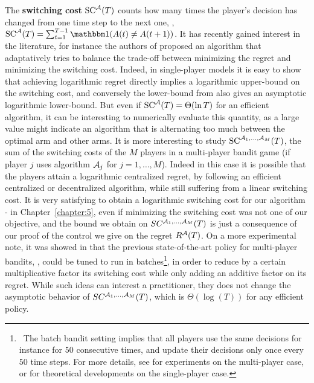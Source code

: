 The \textbf{switching cost} $\mathrm{SC}^{\mathcal{A}}(T)$ counts how many times the player's decision has changed from one time step to the next one, \ie, $\mathrm{SC}^{\cA}(T) = \sum_{t=1}^{T-1} \indic(A(t) \neq A(t+1))$.
It has recently gained interest in the literature, for instance the authors of \cite{Koren17} proposed an algorithm that adaptatively tries to balance the trade-off between minimizing the regret and minimizing the switching cost.
%
Indeed, in single-player models it is easy to show that achieving logarithmic regret directly implies a logarithmic upper-bound on the switching cost, and conversely the lower-bound from \cite{LaiRobbins85} also gives an asymptotic logarithmic lower-bound.
But even if $\mathrm{SC}^{\mathcal{A}}(T) = \Theta(\ln T)$ for an efficient algorithm, it can be interesting to numerically evaluate this quantity, as a large value might indicate an algorithm that is alternating too much between the optimal arm and other arms.
%
It is more interesting to study $\mathrm{SC}^{\mathcal{A}_1,\dots,\mathcal{A}_M}(T)$, the sum of the switching costs of the $M$ players in a multi-player bandit game (if player $j$ uses algorithm $\mathcal{A}_j$ for $j=1,\dots,M$). Indeed in this case it is possible that the players attain a logarithmic centralized regret, by following an efficient centralized or decentralized algorithm, while still suffering from a linear switching cost.
%
It is very satisfying to obtain a logarithmic switching cost for our algorithm \MCTopM-\klUCB{} in Chapter~\ref{chapter:5}, even if minimizing the switching cost was not one of our objective, and the bound we obtain on $SC^{\mathcal{A}_1,\dots,\mathcal{A}_M}(T)$ is just a consequence of our proof of the control we give on the regret $R^{\mathcal{A}}(T)$.
On a more experimental note, it was showed in \cite{modiDemo2016} that the previous state-of-the-art policy for multi-player bandits, \rhoRand, could be tuned to run in batches\footnote{~The batch bandit setting implies that all players use the same decisions for instance for $50$ consecutive times, and update their decisions only once every $50$ time steps. For more details, see \cite{modiDemo2016} for experiments on the multi-player case, or \cite{perchet2016,gao2019batched,kolnogorov2019multi} for theoretical developments on the single-player case.}, in order to reduce by a certain multiplicative factor its switching cost while only adding an additive factor on its regret. While such ideas can interest a practitioner, they does not change the asymptotic behavior of $SC^{\mathcal{A}_1,\dots,\mathcal{A}_M}(T)$, which is $\Theta(\log(T))$ for any efficient policy.


